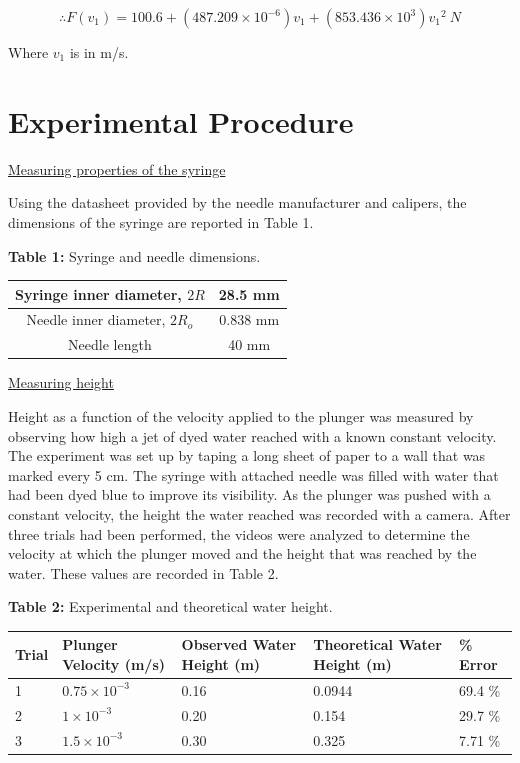\documentclass{article}
\begin{document}
\[ \therefore F(v_{1}) = 100.6 + (487.209 \times 10^{-6}) v_{1} + (853.436 \times 10^{3}) {v_{1}}^2 \ N \tag{2-11} \label{eq:11}\]

Where $v_{1}$ is in m/s.
\\

\section{Experimental Procedure}

\underline{Measuring properties of the syringe}

Using the datasheet provided by the needle manufacturer and calipers, the dimensions of the syringe are reported in Table 1.

\begin{center}\textbf{Table 1:} Syringe and needle dimensions. \end{center}
\begin{center}
\begin{tabular}{| c | c |}
\hline
Syringe inner diameter, $2R$ & 28.5 mm \\ 
\hline
Needle inner diameter, $2R_{o}$ & 0.838 mm \\  
\hline
Needle length & 40 mm \\  
\hline
\end{tabular}
\end{center}

\noindent\underline{Measuring height}

Height as a function of the velocity applied to the plunger was measured by observing how high a jet of dyed water reached with a known constant velocity.
The experiment was set up by taping a long sheet of paper to a wall that was marked every 5 cm.
The syringe with attached needle was filled with water that had been dyed blue to improve its visibility.
As the plunger was pushed with a constant velocity, the height the water reached was recorded with a camera.
After three trials had been performed, the videos were analyzed to determine the velocity at which the plunger moved and the height that was reached by the water.
These values are recorded in Table 2.

\begin{center}\textbf{Table 2:} Experimental and theoretical water height. \end{center}
\begin{center}
\begin{tabular}{| p{1cm} | p{3.6cm} | p{3.6cm} | p{3.6cm} | p{2cm} |}
\hline
\textbf{Trial} & \textbf{Plunger Velocity (m/s)} & \textbf{Observed Water Height (m)} & \textbf{Theoretical Water Height (m)} & \textbf{\% Error} \\
\hline
1 & $0.75 \times 10^{-3}$ & 0.16 & 0.0944 & 69.4 \% \\  
\hline
2 & $1 \times 10^{-3}$ & 0.20 & 0.154 & 29.7 \% \\
\hline
3 & $1.5 \times 10^{-3}$ & 0.30 & 0.325 & 7.71 \% \\  
\hline
\end{tabular}
\end{center}
\end{document}
